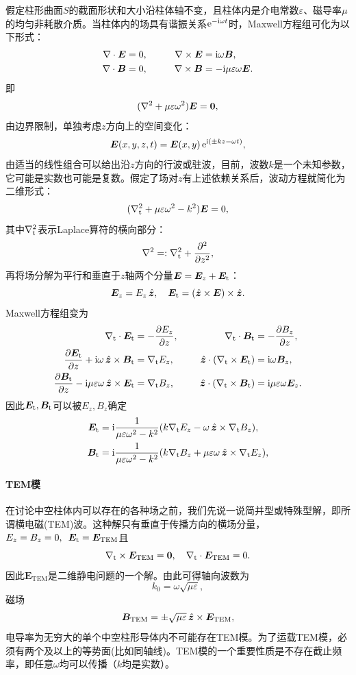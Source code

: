 假定柱形曲面$S$的截面形状和大小沿柱体轴不变，且柱体内是介电常数$\varepsilon$、磁导率$\mu$的均匀非耗散介质。当柱体内的场具有谐振关系$\e{-\i\omega t}$时，Maxwell方程组可化为以下形式：
\begin{alignat*}{2}
    \div\bm E&=0,&\qquad\curl\bm E&=\i\omega\bm B,\\
    \div\bm B&=0,&\curl\bm B&=-\i\mu\varepsilon\omega\bm E.
\end{alignat*}
即
\[
    (\lapla+\mu\varepsilon\omega^2)\bm E=\bm 0,
\]
由边界限制，单独考虑$z$方向上的空间变化：
\[
    \bm E(x,y,z,t)=\bm E(x,y)\e{\i(\pm kz-\omega t)},
\]
由适当的线性组合可以给出沿$z$方向的行波或驻波，目前，波数$k$是一个未知参数，它可能是实数也可能是复数。假定了场对$z$有上述依赖关系后，波动方程就简化为二维形式：
\begin{equation}
    (\lapla_\t+\mu\varepsilon\omega^2-k^2)\bm E=0,
\end{equation}
其中$\lapla_\t$表示Laplace算符的横向部分：
\[
    \lapla=:\lapla_\t+\pp[2]z,
\]
再将场分解为平行和垂直于$z$轴两个分量$\bm E=\bm E_z+\bm E_\t$：
\[
    \bm E_z=E_z\uvec z,\quad\bm E_\t=(\uvec z\times\bm E)\times\uvec z.
\]
Maxwell方程组变为
\begin{alignat*}{2}
    \nabla_\t\cdot\bm E_\t&=-\pv{E_z}z,&\qquad\qquad\nabla_\t\cdot\bm B_\t&=-\pv{B_z}z,\\
    \pv{\bm E_\t}z+\i\omega\uvec z\times\bm B_\t&=\nabla_\t E_z,&\uvec z\cdot(\nabla_\t\times\bm E_\t)&=\i\omega\bm B_z,\\
    \pv{\bm B_\t}z-\i\mu\varepsilon\omega\uvec z\times\bm E_\t&=\nabla_\t B_z,&\uvec z\cdot(\nabla_\t\times\bm B_\t)&=\i\mu\varepsilon\omega\bm E_z.
\end{alignat*}
因此$\bm E_\t,\bm B_\t$可以被$E_z,B_z$确定
\begin{align}
    \bm E_\t&=\i\frac1{\mu\varepsilon\omega^2-k^2}(k\nabla_\t E_z-\omega\uvec z\times\nabla_\t B_z),\\
    \bm B_\t&=\i\frac1{\mu\varepsilon\omega^2-k^2}(k\nabla_\t B_z+\mu\varepsilon\omega\uvec z\times\nabla_\t E_z),
\end{align}
\paragraph{TEM模}
在讨论中空柱体内可以存在的各种场之前，我们先说一说简并型或特殊型解，即所谓横电磁(TEM)波。这种解只有垂直于传播方向的横场分量，$E_z=B_z=0,\enspace\bm E_\t=\bm E_\text{TEM}$且
\begin{equation}
    \nabla_\t\times\bm E_\text{TEM}=\bm 0,\quad\nabla_\t\cdot\bm E_\text{TEM}=0.
\end{equation}
因此$\bm E_\text{TEM}$是二维静电问题的一个解。由此可得轴向波数为
\begin{equation}
    \label{eqn:TEM k0}
    k_0=\omega\sqrt{\mu\varepsilon},
\end{equation}
磁场 
\[
    \bm B_\text{TEM}=\pm\sqrt{\mu\varepsilon}\uvec z\times\bm E_\text{TEM},
\]
电导率为无穷大的单个中空柱形导体内不可能存在TEM模。为了运载TEM模，必须有两个及以上的等势面(比如同轴线)。TEM模的一个重要性质是不存在截止频率，即任意$\omega$均可以传播（$k$均是实数）。
